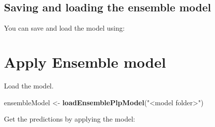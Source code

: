 \documentclass[
]{article}
\newenvironment{Shaded}{\begin{snugshade}}{\end{snugshade}}
\newcommand{\DataTypeTok}[1]{\textcolor[rgb]{0.13,0.29,0.53}{#1}}
\newcommand{\KeywordTok}[1]{\textcolor[rgb]{0.13,0.29,0.53}{\textbf{#1}}}
\newcommand{\NormalTok}[1]{#1}
\newcommand{\OperatorTok}[1]{\textcolor[rgb]{0.81,0.36,0.00}{\textbf{#1}}}
\newcommand{\StringTok}[1]{\textcolor[rgb]{0.31,0.60,0.02}{#1}}
\begin{document}
\hypertarget{saving-and-loading-the-ensemble-model}{%
\subsection{Saving and loading the ensemble
model}\label{saving-and-loading-the-ensemble-model}}

You can save and load the model using:

\begin{Shaded}
\end{Shaded}

\hypertarget{apply-ensemble-model}{%
\section{Apply Ensemble model}\label{apply-ensemble-model}}

\begin{Shaded}
\end{Shaded}

Load the model.

\begin{Shaded}
\begin{Highlighting}[]
\NormalTok{ensembleModel <-}\StringTok{ }\KeywordTok{loadEnsemblePlpModel}\NormalTok{(}\StringTok{"<model folder>"}\NormalTok{)}
\end{Highlighting}
\end{Shaded}

Get the predictions by applying the model:
\end{document}
